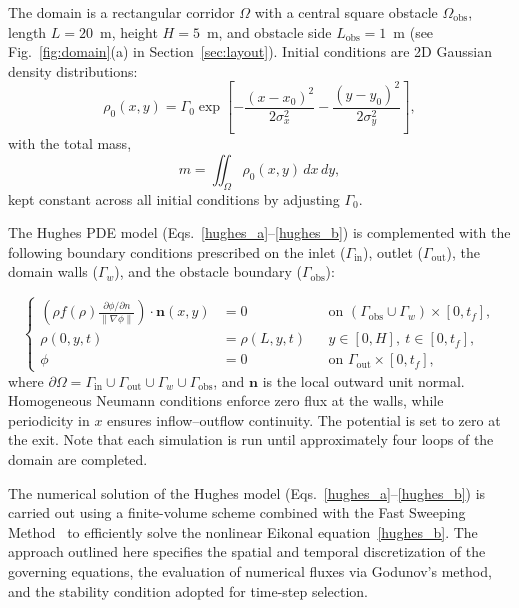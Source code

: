 \documentclass{article}
\begin{document}
The domain is a rectangular corridor $\Omega$ with a central square obstacle $\Omega_{\text{obs}}$, length $L = 20$~m, height $H = 5$~m, and obstacle side $L_{\text{obs}} = 1$~m (see Fig.~\ref{fig:domain}(a) in Section~\ref{sec:layout}). Initial conditions are 2D Gaussian density distributions:
\begin{equation}
\rho_0(x,y) = \Gamma_0 \exp\left[-\frac{(x-x_0)^2}{2\sigma_x^2} - \frac{(y-y_0)^2}{2\sigma_y^2}\right],
\label{eq:initial_condition}
\end{equation}
with the total mass,
\begin{equation}
\label{eq_mass}
m = \iint_\Omega \rho_0(x,y) \, dx\,dy,
\end{equation}
kept constant across all initial conditions by adjusting $\Gamma_0$.

The Hughes PDE model (Eqs.~\eqref{hughes_a}--\eqref{hughes_b}) is complemented with the following boundary conditions prescribed on the inlet ($\Gamma_{\text{in}}$), outlet ($\Gamma_{\text{out}}$), the domain walls ($\Gamma_w$), and the obstacle boundary ($\Gamma_{\text{obs}}$):

\begin{equation}
\left\{
\begin{aligned}
\left( \rho f(\rho) \frac{\partial \phi/\partial n}{\|\nabla \phi\|} \right) \cdot \mathbf{n}(x,y) &= 0 && \text{on } (\Gamma_{\text{obs}} \cup \Gamma_w) \times [0,t_f],\\
\rho(0, y, t) &= \rho(L, y, t) && y \in [0,H],\ t \in [0,t_f],\\
\phi &= 0 && \text{on } \Gamma_{\text{out}} \times [0,t_f],
\end{aligned}
\right.
\label{bcic}
\end{equation}
where $\partial \Omega = \Gamma_{\text{in}} \cup \Gamma_{\text{out}} \cup \Gamma_w \cup \Gamma_{\text{obs}}$, and $\mathbf{n}$ is the local outward unit normal. Homogeneous Neumann conditions enforce zero flux at the walls, while periodicity in $x$ ensures inflow–outflow continuity. The potential is set to zero at the exit. Note that each simulation is run until approximately four loops of the domain are completed. 

The numerical solution of the Hughes model (Eqs.~\eqref{hughes_a}--\eqref{hughes_b}) is carried out using a finite-volume scheme combined with the Fast Sweeping Method~\cite{Zhao2004FastSweeping} to efficiently solve the nonlinear Eikonal equation~\eqref{hughes_b}. The approach outlined here specifies the spatial and temporal discretization of the governing equations, the evaluation of numerical fluxes via Godunov's method, and the stability condition adopted for time-step selection.
\end{document}
